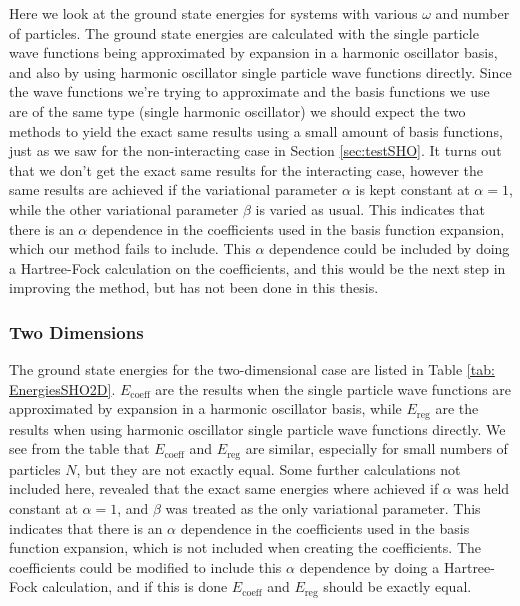 \documentclass[../main.tex]{subfiles}
\begin{document}
Here we look at the ground state energies for systems with various $\omega$ and number of particles. The ground state energies are calculated with the single particle wave functions being approximated by expansion in a harmonic oscillator basis, and also by using harmonic oscillator single particle wave functions directly. Since the wave functions we're trying to approximate and the basis functions we use are of the same type (single harmonic oscillator) we should expect the two methods to yield the exact same results using a small amount of basis functions, just as we saw for the non-interacting case in Section \ref{sec:testSHO}. It turns out that we don't get the exact same results for the interacting case, however the same results are achieved if the variational parameter $\alpha$ is kept constant at $\alpha = 1$, while the other variational parameter $\beta$ is varied as usual. This indicates that there is an $\alpha$ dependence in the coefficients used in the basis function expansion, which our method fails to include. This $\alpha$ dependence could be included by doing a Hartree-Fock calculation on the coefficients, and this would be the next step in improving the method, but has not been done in this thesis.

\subsubsection{Two Dimensions}

The ground state energies for the two-dimensional case are listed in Table \ref{tab: EnergiesSHO2D}. $E_\textrm{coeff}$ are the results when the single particle wave functions are approximated by expansion in a harmonic oscillator basis, while $E_\textrm{reg}$ are the results when using harmonic oscillator single particle wave functions directly. We see from the table that $E_\textrm{coeff}$ and $E_\textrm{reg}$ are similar, especially for small numbers of particles $N$, but they are not exactly equal. Some further calculations not included here, revealed that the exact same energies where achieved if $\alpha$ was held constant at $\alpha = 1$, and $\beta$ was treated as the only variational parameter. This indicates that there is an $\alpha$ dependence in the coefficients used in the basis function expansion, which is not included when creating the coefficients. The coefficients could be modified to include this $\alpha$ dependence by doing a Hartree-Fock calculation, and if this is done $E_\textrm{coeff}$ and $E_\textrm{reg}$ should be exactly equal. 
\end{document}

